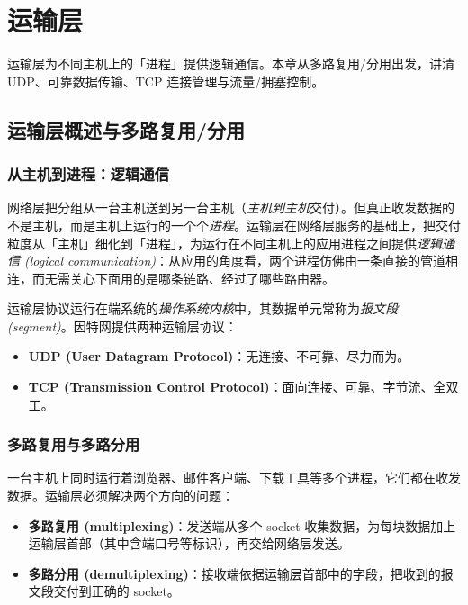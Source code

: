 \clearpage
\begingroup
\let\clearpage\relax
\let\cleardoublepage\relax
\vspace*{\fill}
\chapter{运输层}
\begin{center}
运输层为不同主机上的「进程」提供逻辑通信。本章从多路复用/分用出发，讲清 UDP、可靠数据传输、TCP 连接管理与流量/拥塞控制。
\end{center}
\vspace*{\fill}
\endgroup
\clearpage

\section{运输层概述与多路复用/分用}

\subsection{从主机到进程：逻辑通信}

网络层把分组从一台主机送到另一台主机（\emph{主机到主机}交付）。但真正收发数据的不是主机，而是主机上运行的一个个\emph{进程}。运输层在网络层服务的基础上，把交付粒度从「主机」细化到「进程」，为运行在不同主机上的应用进程之间提供\emph{逻辑通信 (logical communication)}：从应用的角度看，两个进程仿佛由一条直接的管道相连，而无需关心下面用的是哪条链路、经过了哪些路由器。

运输层协议运行在端系统的\emph{操作系统内核}中，其数据单元常称为\emph{报文段 (segment)}。因特网提供两种运输层协议：

\begin{itemize}
    \item \textbf{UDP (User Datagram Protocol)}：无连接、不可靠、尽力而为。
    \item \textbf{TCP (Transmission Control Protocol)}：面向连接、可靠、字节流、全双工。
\end{itemize}

\subsection{多路复用与多路分用}

一台主机上同时运行着浏览器、邮件客户端、下载工具等多个进程，它们都在收发数据。运输层必须解决两个方向的问题：

\begin{itemize}
    \item \textbf{多路复用 (multiplexing)}：发送端从多个 socket 收集数据，为每块数据加上运输层首部（其中含端口号等标识），再交给网络层发送。
    \item \textbf{多路分用 (demultiplexing)}：接收端依据运输层首部中的字段，把收到的报文段交付到正确的 socket。
\end{itemize}

